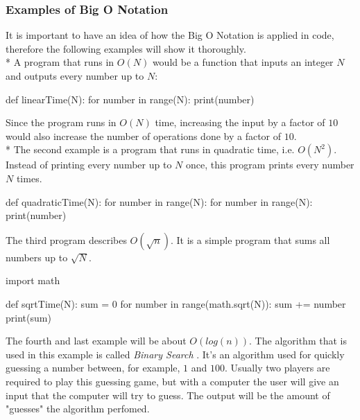\documentclass[main.tex]{subfiles}
\begin{document}
\subsubsection{Examples of Big O Notation}

It is important to have an idea of how the Big O Notation is applied in code, therefore the following examples will show it thoroughly.
\newline
\\*
A program that runs in $O(N)$ would be a function that inputs an integer $N$ and outputs every number up to $N$:
\begin{python}
def linearTime(N):
    for number in range(N):
        print(number)
\end{python}

Since the program runs in $O(N)$ time, increasing the input by a factor of $10$ would also increase the number of operations done by a factor of $10$.
\newline
\\*
The second example is a program that runs in quadratic time, i.e. $O(N^{2})$. Instead of printing every number up to $N$ once, this program prints every number $N$ times.

\begin{python}
    def quadraticTime(N):
        for number in range(N):
            for number in range(N):
                print(number)
\end{python}

\vspace{10mm}

The third program describes $O(\sqrt{n})$. It is a simple program that sums all numbers up to $\sqrt{N}$.

\begin{python}
    import math

    def sqrtTime(N):
        sum = 0
        for number in range(math.sqrt(N)):
            sum += number
        print(sum)
\end{python}

\vspace{10mm}

The fourth and last example will be about $O(log (n))$. The algorithm that is used in this example is called \textit{Binary Search} \cite{binary_search}. It's an algorithm used for quickly guessing a number between, for example, $1$ and $100$. Usually two players are required to play this guessing game, but with a computer the user will give an input that the computer will try to guess. The output will be the amount of "guesses" the algorithm perfomed.
\end{document}
